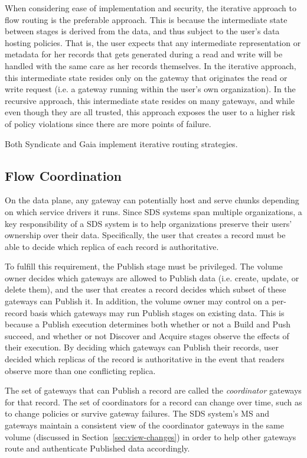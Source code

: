 When considering ease of implementation and security, the iterative approach to flow
routing is the preferable approach.  This is because the intermediate state between
stages is derived from the data, and thus
subject to the user's data hosting policies.  That is, the user expects
that any intermediate representation or metadata for her records that gets
generated during a read and write will be handled with the same care as her
records themselves.  In the iterative approach, this intermediate state resides
only on the gateway that originates the read or write request (i.e. a gateway
running within the user's own organization).  In the recursive approach, this
intermediate state resides on many gateways, and while even though they are all
trusted, this approach exposes the user to a higher risk of policy violations
since there are more points of failure.

Both Syndicate and Gaia implement iterative routing strategies.

\subsection{Flow Coordination}
\label{sec:flow-coordination}

On the data plane, any gateway can potentially host and serve chunks depending
on which service drivers it runs.
Since SDS systems span multiple organizations, a key responsibility of a SDS
system is to help organizations preserve their users' ownership over their 
data.  Specifically, the user that creates a record
must be able to decide which replica of each record is authoritative.

To fulfill this requirement, the Publish stage must be privileged.  The volume owner decides
which gateways are allowed to Publish data (i.e. create, update, or delete
them), and the user that creates a
record decides which subset of these gateways can Publish it.
In addition, the volume owner may control on a
per-record basis which gateways may run Publish stages on existing data.
This is because a Publish
execution determines both whether or not a Build and Push succeed, and
whether or not Discover and Acquire stages observe the effects of their
execution.  By deciding which gateways can Publish their records,
user decided which replicas of the record is authoritative in the event that
readers observe more than one conflicting replica.

The set of gateways that can Publish a record are called the \emph{coordinator}
gateways for that record.
The set of coordinators for a record can change over time, such as to change
policies or survive gateway failures.  The SDS system's MS and gateways
maintain a consistent view of the coordinator gateways in the same volume
(discussed in Section~\ref{sec:view-changes}) in order to help other gateways
route and authenticate Published data accordingly.

